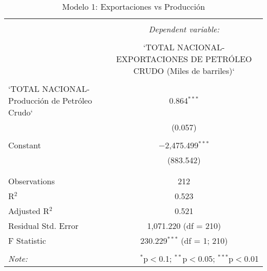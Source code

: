 
\begin{table}[!htbp] \centering 
  \caption{Modelo 1: Exportaciones vs Producción} 
  \label{} 
\begin{tabular}{@{\extracolsep{5pt}}lc} 
\\[-1.8ex]\hline 
\hline \\[-1.8ex] 
 & \multicolumn{1}{c}{\textit{Dependent variable:}} \\ 
\cline{2-2} 
\\[-1.8ex] & `TOTAL NACIONAL-EXPORTACIONES DE PETRÓLEO CRUDO (Miles de barriles)` \\ 
\hline \\[-1.8ex] 
 `TOTAL NACIONAL-Producción de Petróleo Crudo` & 0.864$^{***}$ \\ 
  & (0.057) \\ 
  & \\ 
 Constant & $-$2,475.499$^{***}$ \\ 
  & (883.542) \\ 
  & \\ 
\hline \\[-1.8ex] 
Observations & 212 \\ 
R$^{2}$ & 0.523 \\ 
Adjusted R$^{2}$ & 0.521 \\ 
Residual Std. Error & 1,071.220 (df = 210) \\ 
F Statistic & 230.229$^{***}$ (df = 1; 210) \\ 
\hline 
\hline \\[-1.8ex] 
\textit{Note:}  & \multicolumn{1}{r}{$^{*}$p$<$0.1; $^{**}$p$<$0.05; $^{***}$p$<$0.01} \\ 
\end{tabular} 
\end{table} 
